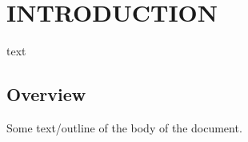 \chapter{INTRODUCTION\label{chapter:introduction}}

text

\section{Overview\label{sec:overview}}

Some text/outline of the body of the document.